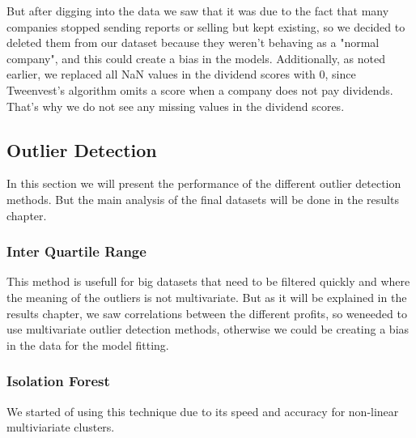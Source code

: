 \documentclass[11pt,english,a4paper,hidelinks]{book}
\begin{document}
\noindent   But after digging into the data we saw that it was due to the fact that many companies stopped sending reports or selling but kept existing, so we decided to deleted them from our dataset because they weren't behaving as a "normal company", and this could create a bias in the models. Additionally, as noted earlier, we replaced all NaN values in the dividend scores with 0, since Tweenvest's algorithm omits a score when a company does not pay dividends. That's why we do not see any missing values in the dividend scores.

\subsection{Outlier Detection}

In this section we will present the performance of the different outlier detection methods. But the main analysis of the final datasets will be done in the results chapter.

\subsubsection{Inter Quartile Range}

This method is usefull for big datasets that need to be filtered quickly and where the meaning of the outliers is not multivariate. But as it will be explained in the results chapter, we saw correlations between the different profits, so weneeded to use multivariate outlier detection methods, otherwise we could be creating a bias in the data for the model fitting.

\subsubsection{Isolation Forest}

We started of using this technique due to its speed and accuracy for non-linear multiviariate clusters.
\end{document}
